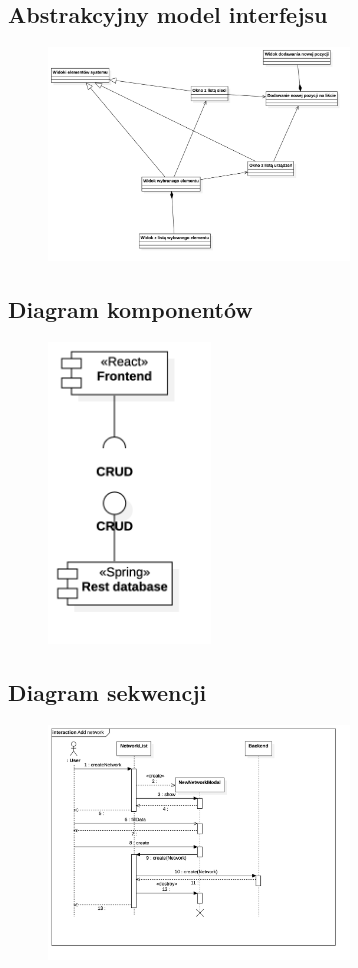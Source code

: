 \documentclass[a4paper,11pt]{article}
\begin{document}
\subsection{Abstrakcyjny model interfejsu}
\begin{figure}[H]
	\includegraphics[width=8cm]{AbstractArchitectureDiagram}
	\centering
\end{figure}

\subsection{Diagram komponentów}
\begin{figure}[H]
	\includegraphics[height=8cm]{ComponentDiagram}
	\centering
\end{figure}

\subsection{Diagram sekwencji}
\begin{figure}[H]
	\includegraphics[width=8cm]{AddNetworkSequenceDiagram}
	\centering
\end{figure}
\end{document}
